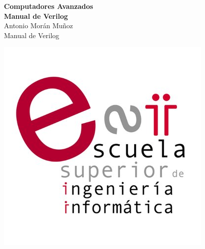 \documentclass[12pt]{article}
\begin{document}

\begin{titlepage}
\begin{flushright}
\LARGE{\textbf{Computadores Avanzados}}\\
\vfill
\Huge{\textbf{Manual de Verilog}}\\
    \vfill
    \large Antonio Morán Muñoz\\
\vfill
\normalsize Manual de Verilog\\
\vfill

\includegraphics[width=0.3\linewidth]{figs/esiiab-logo.jpg}\\ 
 
  
\end{flushright}
\end{titlepage}
\end{document}

